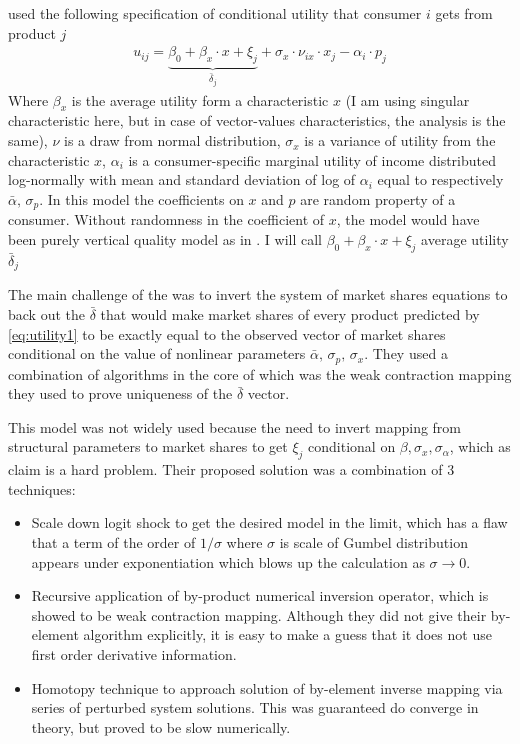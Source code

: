 \documentclass[12pt,letterpaper]{article}
\begin{document}
	\cite{berry2007pure} used the following specification of conditional utility that consumer $i$ gets from product $j$ 
	\begin{align}
	u_{ij} = \underbrace{\beta_0 + \beta_x\cdot x+ \xi_j}_{\bar \delta_j} + \sigma_x \cdot \nu_{ix} \cdot x_j - \alpha_i\cdot p_j
	\label{eq:utility1}
	\end{align}
	Where $\beta_x$ is the average utility form a characteristic $x$ (I am using singular characteristic here, but in case of vector-values characteristics, the analysis is the same), $\nu$ is a draw from normal distribution, $\sigma_x$ is a variance of utility from the characteristic $x$, $\alpha_i$ is a consumer-specific marginal utility of income distributed log-normally with mean and standard deviation of log of $\alpha_i$ equal to respectively $\bar{\alpha},\, \sigma_p$. In this model the coefficients on $x$ and $p$ are random property of a consumer. Without randomness in the coefficient of $x$, the model would have been purely vertical quality model as in \cite{bresnahan1990entry}. I will call $\beta_0 + \beta_x\cdot x+ \xi_j$ average utility $\bar \delta_j$
	
	The main challenge of the \cite{berry2007pure} was to invert the system of market shares equations to back out the $\bar\delta$ that would make market shares of every product predicted by \ref{eq:utility1} to be exactly equal to the observed vector of market shares conditional on the value of nonlinear parameters $\bar{\alpha},\, \sigma_p,\, \sigma_x$. They used a combination of algorithms in the core of which was the weak contraction mapping they used to prove uniqueness of the $\bar \delta$ vector.
	
	This model was not widely used because the need to invert mapping from structural parameters to market shares to get $\xi_j$ conditional on $\beta, \sigma_x, \sigma_\alpha$, which as \cite{berry2007pure} claim is a hard problem. Their proposed solution was a combination of 3 techniques: 
	\begin{itemize}
	\item Scale down logit shock to get the desired model in the limit, which has a flaw that a term of the order of $1/\sigma$ where $\sigma$ is scale of Gumbel distribution appears under exponentiation which blows up the calculation as $\sigma \to 0$.
	\item Recursive application of by-product numerical inversion operator, which is showed to be weak contraction mapping. Although they did not give their by-element algorithm explicitly, it is easy to make a guess that it does not use first order derivative information. 
	\item Homotopy technique to approach solution of by-element inverse mapping via series of perturbed system solutions. This was guaranteed do converge in theory, but proved to be slow numerically.
	\end{itemize}
	
\end{document}
